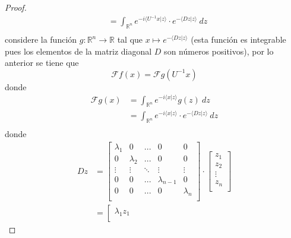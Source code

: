 \documentclass[12pt]{report}
\theoremstyle{largebreak}
\newcommand\cf[3]{\ensuremath{#1:#2\rightarrow#3}}
\newcommand\pint[2]{\ensuremath{\langle#1| #2\rangle}}
\newcommand{\fou}[1]{\ensuremath{\mathcal{F}#1}}
\begin{document}
\begin{proof}
\begin{equation*}
\begin{split}
                &=\int_{\mathbb{R}^n}e^{ -i\pint{U^{-1}x}{z}}\cdot e^{-\pint{Dz}{z}}\:dz\\
            \end{split}
        \end{equation*}
        considere la función $\cf{g}{\mathbb{R}^n}{\mathbb{R}}$ tal que $x\mapsto e^{ -\pint{Dz}{z}}$ (esta función es integrable pues los elementos de la matriz diagonal $D$ son números positivos), por lo anterior se tiene que
        \begin{equation*}
            \fou{f}(x)=\fou{g}(U^{-1}x)
        \end{equation*}
        donde
        \begin{equation*}
            \begin{split}
                \fou{g}(x)&=\int_{\mathbb{R}^n}e^{ -i\pint{x}{z}}g(z)\:dz\\
                &=\int_{\mathbb{R}^n}e^{ -i\pint{x}{z}}\cdot e^{-\pint{Dz}{z}}\:dz\\
            \end{split}
        \end{equation*}
        donde
        \begin{equation*}
            \begin{split}
                Dz&=\left[
                    \begin{array}{ccccc}
                        \lambda_1 & 0 & ... & 0 & 0\\
                        0 & \lambda_2 & ... & 0 & 0\\
                        \vdots & \vdots & \ddots & \vdots & \vdots \\
                        0 & 0 & ... & \lambda_{ n-1} & 0\\
                        0 & 0 & ... & 0 & \lambda_n\\
                    \end{array}
                 \right]\cdot\left[\begin{array}{c}
                    z_1\\
                    z_2\\
                    \vdots\\
                    z_n\\
                \end{array}\right]\\
                &=\left[\begin{array}{c}
                    \lambda_1z_1\\

\end{array}
\end{split}
\end{equation*}
\end{proof}
\end{document}
